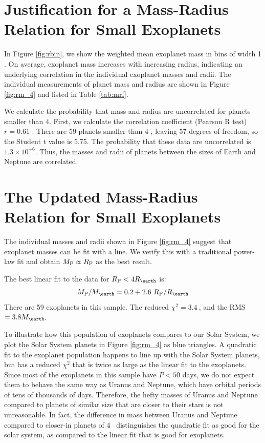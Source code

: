 \documentclass[11pt]{aastex}
\newcommand{\rspecial}{4 \rearth}
\newcommand{\chisquared}{3.4~}
\newcommand{\rms}{3.8 \mearth}
\begin{document}
\section{Justification for a Mass-Radius Relation for Small Exoplanets}
In Figure \ref{fig:rbin}, we show the weighted mean exoplanet mass in bins of width 1 \rearth.  On average, exoplanet mass increases with increasing radius, indicating an underlying correlation in the individual exoplanet masses and radii.  The individual measurements of planet mass and radius are shown in Figure \ref{fig:rm_4} and listed in Table \ref{tab:mrf}.

We calculate the probability that mass and radius are uncorrelated for planets smaller than 4\rearth.  First, we calculate the correlation coefficient (Pearson R test) $r=0.61$ .  There are 59 planets smaller than 4 \rearth, leaving 57 degrees of freedom, so the Student t value is 5.75.  The probability that these data are uncorrelated is $1.3 \times 10^{-6}$.  Thus, the masses and radii of planets between the sizes of Earth and Neptune are correlated.

\section{The Updated Mass-Radius Relation for Small Exoplanets}
The individual masses and radii shown in Figure \ref{fig:rm_4} suggest that exoplanet masses can be fit with a line.  We verify this with a traditional power-law fit and obtain $M_{\rm P} \propto R_{\rm P}$ as the best result.

The best linear fit to the data for $\rpl < \rspecial$ is:
$$
\mpl/\mearth = 0.2  +     2.6~\rpl/\rearth
$$
There are 59 exoplanets in this sample.  The reduced $\chi^2=\chisquared$, and the RMS $=\rms$.

To illustrate how this population of exoplanets compares to our Solar System, we plot the Solar System planets in Figure \ref{fig:rm_4} as blue triangles.  A quadratic fit to the exoplanet population happens to line up with the Solar System planets, but has a reduced $\chi^2$ that is twice as large as the linear fit to the exoplanets.  Since most of the exoplanets in this sample have $P < 50$ days, we do not expect them to behave the same way as Uranus and Neptune, which have orbital periods of tens of thousands of days.  Therefore, the hefty masses of Uranus and Neptune compared to planets of similar size that are closer to their stars is not unreasonable.  In fact, the difference in mass between Uranus and Neptune compared to closer-in planets of 4 \rearth\ distinguishes the quadratic fit as good for the solar system, as compared to the linear fit that is good for exoplanets.
\end{document}
